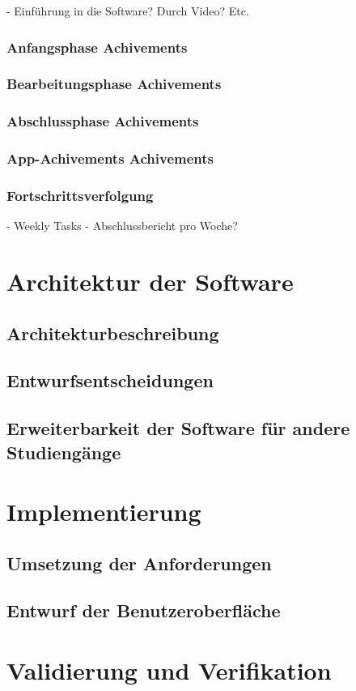 \documentclass{scrreprt}
\begin{document}
- Einführung in die Software? Durch Video? Etc.
\subsection{Anfangsphase Achivements}
\subsection{Bearbeitungsphase Achivements}
\subsection{Abschlussphase Achivements}
\subsection{App-Achivements Achivements}
\subsection{Fortschrittsverfolgung}
- Weekly Tasks
- Abschlussbericht pro Woche?

\chapter{Architektur der Software}
\section{Architekturbeschreibung}
\section{Entwurfsentscheidungen}
\section{Erweiterbarkeit der Software für andere Studiengänge}
\chapter{Implementierung}
\section{Umsetzung der Anforderungen}
\section{Entwurf der Benutzeroberfläche}

\chapter{Validierung und Verifikation}
\end{document}
